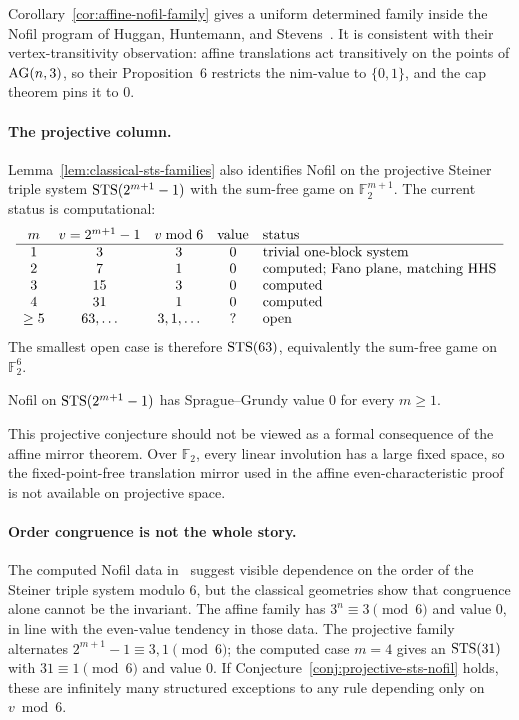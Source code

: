 Corollary~\ref{cor:affine-nofil-family} gives a uniform determined family inside the
Nofil program of Huggan, Huntemann, and Stevens~\cite{huggan2022nofil}. It is consistent
with their vertex-transitivity observation: affine translations act transitively on the
points of $\mathrm{AG}(n,3)$, so their Proposition~6 restricts the nim-value to $\{0,1\}$, and
the cap theorem pins it to $0$.

\paragraph{The projective column.}
Lemma~\ref{lem:classical-sts-families} also identifies Nofil on the projective Steiner
triple system $\mathrm{STS}(2^{m+1}-1)$ with the sum-free game on $\mathbb F_2^{m+1}$. The
current status is computational:
\[
\begin{array}{c@{\quad}c@{\quad}c@{\quad}c@{\quad}l}
m & v=2^{m+1}-1 & v\bmod 6 & \text{value} & \text{status}\\
\hline
1 & 3  & 3 & 0 & \text{trivial one-block system}\\
2 & 7  & 1 & 0 & \text{computed; Fano plane, matching HHS}\\
3 & 15 & 3 & 0 & \text{computed}\\
4 & 31 & 1 & 0 & \text{computed}\\
\geq 5 & 63,\ldots & 3,1,\ldots & ? & \text{open}
\end{array}
\]
The smallest open case is therefore $\mathrm{STS}(63)$, equivalently the sum-free game on
$\mathbb F_2^6$.

\begin{conjecture}
\label{conj:projective-sts-nofil}
Nofil on $\mathrm{STS}(2^{m+1}-1)$ has Sprague--Grundy value $0$ for every $m\geq 1$.
\end{conjecture}

This projective conjecture should not be viewed as a formal consequence of the affine
mirror theorem. Over $\mathbb F_2$, every linear involution has a large fixed space, so
the fixed-point-free translation mirror used in the affine even-characteristic proof is
not available on projective space.

\paragraph{Order congruence is not the whole story.}
The computed Nofil data in~\cite{huggan2022nofil} suggest visible dependence on the order
of the Steiner triple system modulo $6$, but the classical geometries show that congruence
alone cannot be the invariant. The affine family has $3^n\equiv 3\pmod 6$ and value $0$,
in line with the even-value tendency in those data. The projective family alternates
$2^{m+1}-1\equiv 3,1\pmod 6$; the computed case $m=4$ gives an $\mathrm{STS}(31)$ with
$31\equiv 1\pmod 6$ and value $0$. If Conjecture~\ref{conj:projective-sts-nofil} holds,
these are infinitely many structured exceptions to any rule depending only on $v\bmod 6$.
